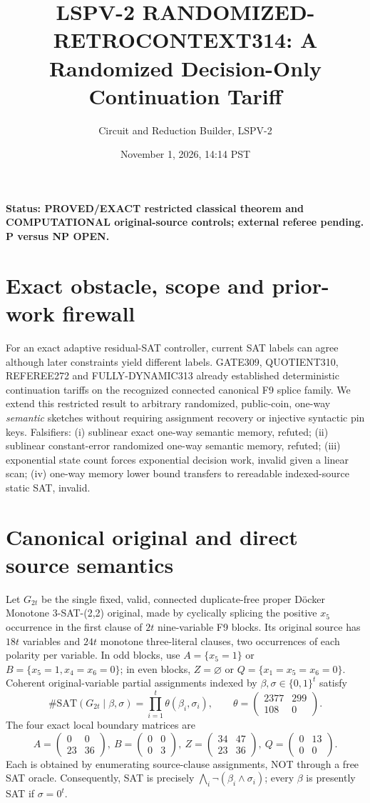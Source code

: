 \documentclass[11pt]{article}
\title{LSPV-2 RANDOMIZED-RETROCONTEXT314: A Randomized Decision-Only Continuation Tariff}
\author{Circuit and Reduction Builder, LSPV-2}
\date{November 1, 2026, 14:14 PST}
\begin{document}
\maketitle
\noindent\textbf{Status: PROVED/EXACT restricted classical theorem and COMPUTATIONAL original-source controls; external referee pending. P versus NP OPEN.}
\section{Exact obstacle, scope and prior-work firewall}
For an exact adaptive residual-SAT controller, current SAT labels can agree although later constraints yield different labels. GATE309, QUOTIENT310, REFEREE272 and FULLY-DYNAMIC313 already established deterministic continuation tariffs on the recognized connected canonical F9 splice family. We extend this restricted result to arbitrary randomized, public-coin, one-way \emph{semantic} sketches without requiring assignment recovery or injective syntactic pin keys. Falsifiers: (i) sublinear exact one-way semantic memory, refuted; (ii) sublinear constant-error randomized one-way semantic memory, refuted; (iii) exponential state count forces exponential decision work, invalid given a linear scan; (iv) one-way memory lower bound transfers to rereadable indexed-source static SAT, invalid.
\section{Canonical original and direct source semantics}
Let $G_{2t}$ be the single fixed, valid, connected duplicate-free proper D\"ocker Monotone 3-SAT-(2,2) original, made by cyclically splicing the positive $x_5$ occurrence in the first clause of $2t$ nine-variable F9 blocks. Its original source has $18t$ variables and $24t$ monotone three-literal clauses, two occurrences of each polarity per variable. In odd blocks, use $A=\{x_5=1\}$ or $B=\{x_5=1,x_4=x_6=0\}$; in even blocks, $Z=\varnothing$ or $Q=\{x_1=x_5=x_6=0\}$. Coherent original-variable partial assignments indexed by $\beta,\sigma\in\{0,1\}^t$ satisfy
\[
\#\mathrm{SAT}(G_{2t}\mid\beta,\sigma)=\prod_{i=1}^t\theta(\beta_i,\sigma_i),\qquad
\theta=\begin{pmatrix}2377&299\\108&0\end{pmatrix}.
\]
The four exact local boundary matrices are
\[
A=\begin{pmatrix}0&0\\23&36\end{pmatrix},~
B=\begin{pmatrix}0&0\\0&3\end{pmatrix},~
Z=\begin{pmatrix}34&47\\23&36\end{pmatrix},~
Q=\begin{pmatrix}0&13\\0&0\end{pmatrix}.
\]
Each is obtained by enumerating source-clause assignments, NOT through a free SAT oracle. Consequently, SAT is precisely $\bigwedge_i\neg(\beta_i\land\sigma_i)$; every $\beta$ is presently SAT if $\sigma=0^t$.
\end{document}
